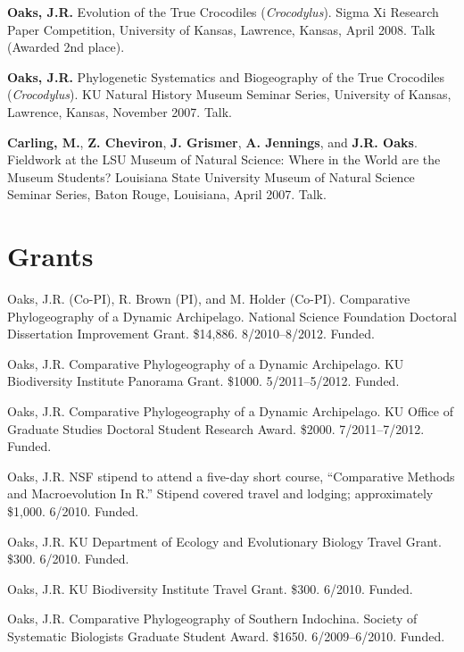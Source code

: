 \myHangIndent
{\bf Oaks, J.R.}
Evolution of the True Crocodiles (\emph{Crocodylus}).
Sigma Xi Research Paper Competition, University of Kansas, Lawrence, Kansas, April 2008.
Talk (Awarded 2nd place).

\myHangIndent
{\bf Oaks, J.R.}
Phylogenetic Systematics and Biogeography of the True Crocodiles
(\emph{Crocodylus}).
KU Natural History Museum Seminar Series, University of Kansas, Lawrence,
Kansas, November 2007.
Talk.

\myHangIndent
{\bf Carling, M.}, {\bf Z. Cheviron}, {\bf J. Grismer}, {\bf A. Jennings}, and
{\bf J.R. Oaks}.
Fieldwork at the LSU Museum of Natural Science: Where in the World are the
Museum Students?
Louisiana State University Museum of Natural Science Seminar Series, Baton
Rouge, Louisiana, April 2007.
Talk.

\section*{Grants}
\myHangIndent
Oaks, J.R. (Co-PI), R. Brown (PI), and M. Holder (Co-PI).
Comparative Phylogeography of a Dynamic Archipelago.
National Science Foundation Doctoral Dissertation Improvement Grant.
\$14,886.
8/2010--8/2012.
Funded.

\myHangIndent
Oaks, J.R.
Comparative Phylogeography of a Dynamic Archipelago.
KU Biodiversity Institute Panorama Grant.
\$1000.
5/2011--5/2012.
Funded.

\myHangIndent
Oaks, J.R.
Comparative Phylogeography of a Dynamic Archipelago.
KU Office of Graduate Studies Doctoral Student Research Award.
\$2000.
7/2011--7/2012.
Funded.

\myHangIndent
Oaks, J.R.
NSF stipend to attend a five-day short course, ``Comparative Methods and
Macroevolution In R.''
Stipend covered travel and lodging; approximately \$1,000.
6/2010.
Funded.

\myHangIndent
Oaks, J.R.
KU Department of Ecology and Evolutionary Biology Travel Grant.
\$300.
6/2010.
Funded.

\myHangIndent
Oaks, J.R.
KU Biodiversity Institute Travel Grant.
\$300.
6/2010.
Funded.

\myHangIndent
Oaks, J.R.
Comparative Phylogeography of Southern Indochina.
Society of Systematic Biologists Graduate Student Award.
\$1650.
6/2009--6/2010.
Funded.

